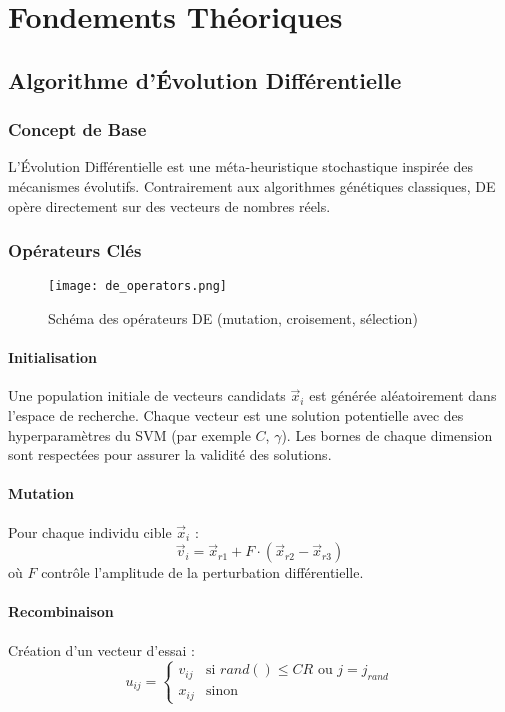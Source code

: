 \documentclass[a4paper, 12pt]{article}
\begin{document}
\section{Fondements Théoriques}
\subsection{Algorithme d'Évolution Différentielle}
\subsubsection{Concept de Base}
L'Évolution Différentielle est une méta-heuristique stochastique inspirée des mécanismes évolutifs. Contrairement aux algorithmes génétiques classiques, DE opère directement sur des vecteurs de nombres réels.


\subsubsection{Opérateurs Clés}
\centering
\begin{figure}[h]
\centering
\texttt{[image: de\_operators.png]}
\caption{Schéma des opérateurs DE (mutation, croisement, sélection)}
\label{fig:de_ops}
\end{figure}

\paragraph{Initialisation} Une population initiale de vecteurs candidats $\vec{x}_i$ est générée aléatoirement dans l’espace de recherche. Chaque vecteur est une solution potentielle avec des hyperparamètres du SVM (par exemple $C$, $\gamma$). Les bornes de chaque dimension sont respectées pour assurer la validité des solutions.

\paragraph{Mutation} Pour chaque individu cible $\vec{x}_i$ :
\[ \vec{v}_i = \vec{x}_{r1} + F \cdot (\vec{x}_{r2} - \vec{x}_{r3}) \]
où $F$ contrôle l'amplitude de la perturbation différentielle.

\paragraph{Recombinaison} Création d'un vecteur d'essai :
\[ u_{ij} = \begin{cases} 
v_{ij} & \text{si } rand() \leq CR \text{ ou } j = j_{rand} \\
x_{ij} & \text{sinon}
\end{cases} \]
\end{document}
